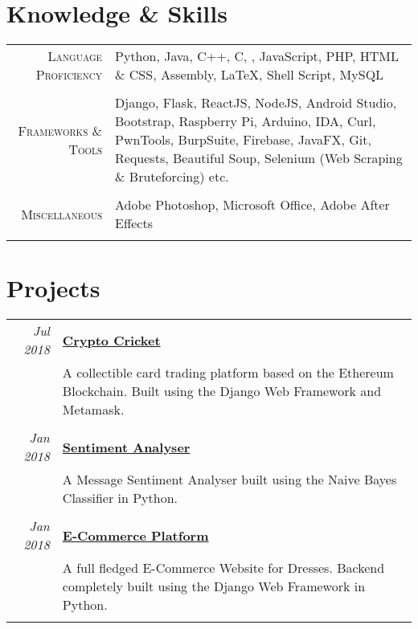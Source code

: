 \documentclass[a4paper,10pt]{article}
\begin{document}
\section{Knowledge \& Skills}
\begin{tabular}{r|p{12.5cm}}
 \textsc{Language Proficiency} & Python, Java, C++, C, , JavaScript, PHP, HTML \& CSS, Assembly, LaTeX, Shell Script, MySQL\\\multicolumn{1}{c}{}\\
 \textsc{Frameworks \& Tools} & Django, Flask, ReactJS, NodeJS, Android Studio, Bootstrap, Raspberry Pi, Arduino, IDA, Curl, PwnTools, BurpSuite, Firebase, JavaFX, Git, Requests, Beautiful Soup, Selenium (Web Scraping \& Bruteforcing) etc.\\\multicolumn{1}{c}{}\\
 \textsc{Miscellaneous} & Adobe Photoshop, Microsoft Office, Adobe After Effects\\\multicolumn{1}{c}{}
\end{tabular}

\section{Projects}
\begin{tabular}{r|p{14.5cm}}
 \emph{Jul 2018} & \href{http://cricket4crypto.com/}{\textbf{Crypto Cricket}} \\&\normalsize{A collectible card trading platform based on the Ethereum Blockchain. Built using the Django Web Framework and Metamask.}\\\multicolumn{2}{c}{} \\
 \emph{Jan 2018} & \href{https://sentiment-analyser.yashitm.tech}{\textbf{Sentiment Analyser}} \\&\normalsize{A Message Sentiment Analyser built using the Naive Bayes Classifier in Python.}\\\multicolumn{2}{c}{} \\
 \emph{Jan 2018} & \href{https://github.com/YashitM/E-Commerce-Platform}{\textbf{E-Commerce Platform}} \\&\normalsize{A full fledged E-Commerce Website for Dresses. Backend completely built using the Django Web Framework in Python.}\\\multicolumn{2}{c}{} \\
 \end{tabular}
 
 \newpage
 
\end{document}
